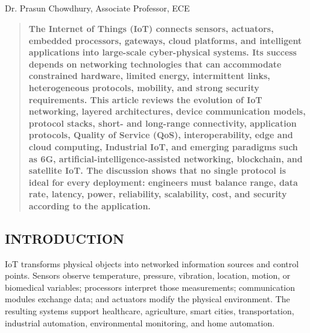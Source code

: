 ﻿\begin{center}
  \section{}
  Dr. Prasun Chowdhury, Associate Professor, ECE
\end{center}

\setcounter{figure}{0}
\setcounter{table}{0}

\begingroup
  \setlength{\parskip}{1pt}
  \setlength{\multicolsep}{3pt}
  \setlength{\abovecaptionskip}{1.5pt}
  \setlength{\belowcaptionskip}{1.5pt}

\begin{multicols}{2}

  \begin{abstract}
    \bfseries
    The Internet of Things (IoT) connects sensors, actuators, embedded processors, gateways, cloud platforms, and intelligent applications into large-scale cyber-physical systems. Its success depends on networking technologies that can accommodate constrained hardware, limited energy, intermittent links, heterogeneous protocols, mobility, and strong security requirements. This article reviews the evolution of IoT networking, layered architectures, device communication models, protocol stacks, short- and long-range connectivity, application protocols, Quality of Service (QoS), interoperability, edge and cloud computing, Industrial IoT, and emerging paradigms such as 6G, artificial-intelligence-assisted networking, blockchain, and satellite IoT. The discussion shows that no single protocol is ideal for every deployment: engineers must balance range, data rate, latency, power, reliability, scalability, cost, and security according to the application.
  \end{abstract}

  \subsection*{\centering\uppercase{Introduction}}
  IoT transforms physical objects into networked information sources and control points. Sensors observe temperature, pressure, vibration, location, motion, or biomedical variables; processors interpret those measurements; communication modules exchange data; and actuators modify the physical environment. The resulting systems support healthcare, agriculture, smart cities, transportation, industrial automation, environmental monitoring, and home automation.


\end{multicols}
